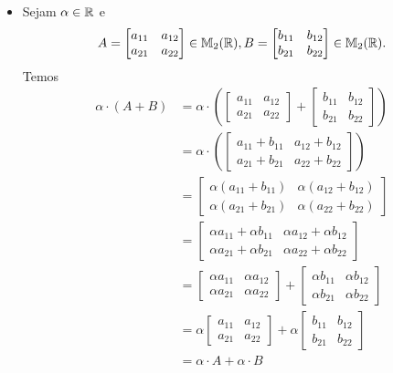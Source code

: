 \documentclass[12pt]{exam}
\begin{document}
\begin{itemize}
        \item Sejam $\alpha \in \mathbb{R}$ e
        \[
        A = \begin{bmatrix} a_{11} & a_{12}\\a_{21} & a_{22}\end{bmatrix} \in \mathbb{M}_{2}(\mathbb{R}),
        B = \begin{bmatrix} b_{11} & b_{12}\\b_{21} & b_{22}\end{bmatrix} \in \mathbb{M}_{2}(\mathbb{R}).
        \]
        Temos
        \begin{align*}
            \alpha\cdot(A + B) & = \alpha\cdot\left(
            \begin{bmatrix} a_{11} & a_{12}\\a_{21} & a_{22}\end{bmatrix} +
            \begin{bmatrix} b_{11} & b_{12}\\b_{21} & b_{22}\end{bmatrix}\right)
            \\ &= \alpha\cdot\left(\begin{bmatrix} a_{11} + b_{11} & a_{12} + b_{12}\\a_{21} + b_{21} & a_{22} + b_{22}\end{bmatrix}\right)
            \\ &= \begin{bmatrix} \alpha(a_{11} + b_{11}) & \alpha(a_{12} + b_{12})\\\alpha(a_{21} + b_{21}) & \alpha(a_{22} + b_{22})\end{bmatrix}
            \\ &= \begin{bmatrix} \alpha a_{11} + \alpha b_{11} & \alpha a_{12} + \alpha b_{12}\\\alpha a_{21} + \alpha b_{21} & \alpha a_{22} + \alpha b_{22}\end{bmatrix}
            \\ &= \begin{bmatrix} \alpha a_{11} & \alpha a_{12}\\ \alpha a_{21} & \alpha a_{22}\end{bmatrix}
            + \begin{bmatrix} \alpha b_{11} & \alpha b_{12}\\ \alpha b_{21} & \alpha b_{22}\end{bmatrix}
            \\ &= \alpha\begin{bmatrix} a_{11} & a_{12}\\a_{21} & a_{22}\end{bmatrix} +
            \alpha\begin{bmatrix} b_{11} & b_{12}\\b_{21} & b_{22}\end{bmatrix}
            \\ &= \alpha\cdot A + \alpha\cdot B
        \end{align*}


\end{itemize}
\end{document}
